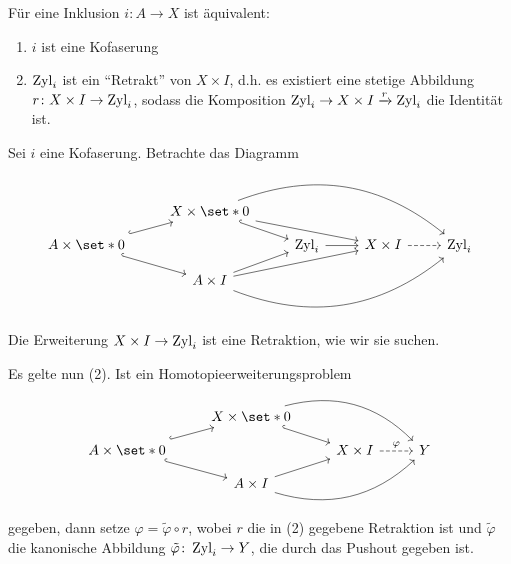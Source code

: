 \begin{satz}[{name=[Wann sind Inklusionen Kofaserungen]}]
	Für eine Inklusion $i \colon A \to X$ ist äquivalent:
	\begin{enumerate}[(1)]
		\item $i$ ist eine Kofaserung
		\item $\operatorname{Zyl}_i$ ist ein \enquote{Retrakt} von $X \times I$, d.h. es existiert eine stetige Abbildung $r \colon X \times I \to \operatorname{Zyl}_i$, sodass die Komposition $\operatorname{Zyl}_i \to X \times I \xrightarrow{r} \operatorname{Zyl}_i$ die Identität ist.
	\end{enumerate}
\end{satz}
\begin{beweis}
	Sei $i$ eine Kofaserung.
	Betrachte das Diagramm
	\[
		\begin{tikzcd}[row sep=small]
			& X \times \set*{0}  \drar[hook] \ar[rrd] \ar[rrrd,bend left] \\
			A \times \set*{0} \urar[hook] \drar[hook] & & \Zyl_i \rar & X \times I \rar[dashed] & \Zyl_i  \\
			& A \times I \urar \ar[urr] \ar[urrr,bend right]
		\end{tikzcd}
	\]
	Die Erweiterung $X \times I \to \operatorname{Zyl}_i$ ist eine Retraktion, wie wir sie suchen.
	
	Es gelte nun (2).
	Ist ein Homotopieerweiterungsproblem
	\[
		\begin{tikzcd}[row sep=small]
			& X \times \set*{0}  \drar[hook] \ar[rrd,bend left] \\
			A \times \set*{0} \urar[hook] \drar[hook] & & X \times I \rar[dashed,"\varphi"] & Y \\
			& A \times I \urar \ar[urr,bend right]
		\end{tikzcd}
	\]
	gegeben, dann setze $\varphi = \tilde{\varphi} \circ r$, wobei $r$ die in (2) gegebene Retraktion ist und $\tilde{\varphi}$ die kanonische Abbildung $\tilde{\varphi} \colon \operatorname{Zyl}_i \to Y$, die durch das Pushout gegeben ist.
\end{beweis}

